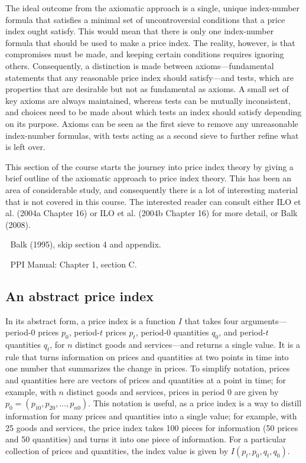 \documentclass[]{article}
\begin{document}
The ideal outcome from the axiomatic approach is a single, unique index-number formula that satisfies a minimal set of uncontroversial conditions that a price index ought satisfy. This would mean that there is only one index-number formula that should be used to make a price index. The reality, however, is that compromises must be made, and keeping certain conditions requires ignoring others. Consequently, a distinction is made between axioms---fundamental statements that any reasonable price index should satisfy---and tests, which are properties that are desirable but not as fundamental as axioms. A small set of key axioms are always maintained, whereas tests can be mutually inconsistent, and choices need to be made about which tests an index should satisfy depending on its purpose. Axioms can be seen as the first sieve to remove any unreasonable index-number formulas, with tests acting as a second sieve to further refine what is left over.

This section of the course starts the journey into price index theory by giving a brief outline of the axiomatic approach to price index theory. This has been an area of considerable study, and consequently there is a lot of interesting material that is not covered in this course. The interested reader can consult either ILO et al. (2004a Chapter 16) or ILO et al. (2004b Chapter 16) for more detail, or Balk (2008).

📖 Balk (1995), skip section 4 and appendix.

📖 PPI Manual: Chapter 1, section C.

\hypertarget{an-abstract-price-index}{%
\subsection{An abstract price index}\label{an-abstract-price-index}}

In its abstract form, a price index is a function \(I\) that takes four arguments---period-0 prices \(p_{0}\), period-\(t\) prices \(p_{t}\), period-0 quantities \(q_{0}\), and period-\(t\) quantities \(q_{t}\), for \(n\) distinct goods and services---and returns a single value. It is a rule that turns information on prices and quantities at two points in time into one number that summarizes the change in prices. To simplify notation, prices and quantities here are vectors of prices and quantities at a point in time; for example, with \(n\) distinct goods and services, prices in period 0 are given by \(p_0 = (p_{10}, p_{20}, \ldots, p_{n0})\). This notation is useful, as a price index is a way to distill information for many prices and quantities into a single value; for example, with 25 goods and services, the price index takes 100 pieces for information (50 prices and 50 quantities) and turns it into one piece of information. For a particular collection of prices and quantities, the index value is given by \(I(p_{t}, p_{0}, q_{t}, q_{0})\).
\end{document}
